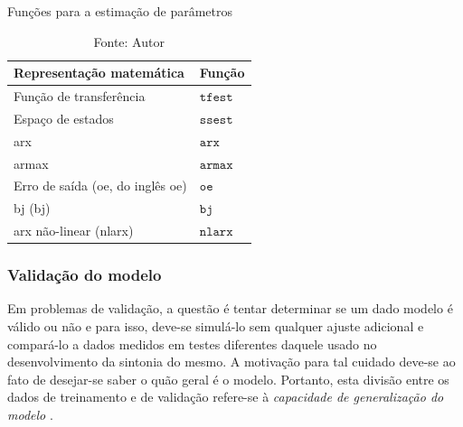 \begin{table}[h]
	\centering
	\caption{Funções para a estimação de parâmetros}
	\label{tab:param_est_functions}
	\begin{tabular}{ll} \toprule
		{Representação matemática}		                                & {Função}				                    \\ \midrule
		Função de transferência		                                    & $\mathtt{tfest}$                          \\
		Espaço de estados   		                                    & $\mathtt{ssest}$                          \\
		\acrshort{arx}		                                            & $\mathtt{arx}$                            \\
		\acrshort{armax}		                                        & $\mathtt{armax}$                          \\
		Erro de saída (\acrshort{oe}, do inglês \acrlong{oe})		    & $\mathtt{oe}$                             \\
		\acrlong{bj} (\acrshort{bj})             	                    & $\mathtt{bj}$                             \\
		\acrshort{arx} não-linear (\acrshort{nlarx})                    & $\mathtt{nlarx}$                          \\ \bottomrule
	\end{tabular}
	\caption*{Fonte: Autor}
\end{table}

\subsubsection{Validação do modelo}
\label{subsubsec:validacao_do_modelo}

Em problemas de validação, a questão é tentar determinar se um dado modelo é válido ou não e para isso,
deve-se simulá-lo sem qualquer ajuste adicional e compará-lo a dados medidos em testes diferentes daquele
usado no desenvolvimento da sintonia do mesmo. A motivação para tal cuidado deve-se ao fato de desejar-se
saber o quão geral é o modelo. Portanto, esta divisão entre os dados de treinamento e de validação refere-se
à \textit{capacidade de generalização do modelo} \cite{Aguirre2015}.

